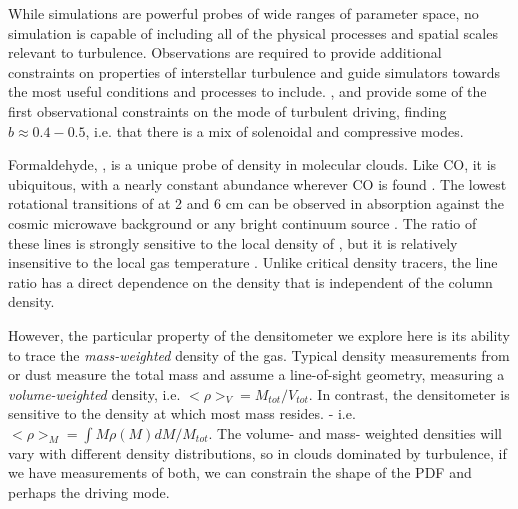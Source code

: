 While simulations are powerful probes of wide ranges of parameter space, no
simulation is capable of including all of the physical processes and spatial
scales relevant to turbulence.  Observations are required to provide additional
constraints on properties of interstellar turbulence and guide simulators
towards the most useful conditions and processes to include.
\citet{Brunt2010c}, \citet{Kainulainen2012a} and \citet{Kainulainen2013a} provide some
of the first observational constraints on the mode of turbulent driving,
finding $b\approx0.4-0.5$, i.e. that there is a mix of solenoidal and
compressive modes.


Formaldehyde, \formaldehyde, is a unique probe of density in molecular clouds.
Like CO, it is ubiquitous, with a nearly constant abundance wherever CO is
found \citep{Mangum1993a,Tang2013a}.  The lowest rotational transitions of
\ortho at 2 and 6 cm can be observed in absorption against the cosmic microwave
background or any bright continuum source \citep{Ginsburg2011a,Darling2012b}.
The ratio of these lines is strongly sensitive to the local density of \hh, but
it is relatively insensitive to the local gas temperature
\citep{Troscompt2009a,Wiesenfeld2013a}.  Unlike critical density tracers, the
\formaldehyde line ratio has a direct dependence on the density that is
independent of the column density.

However, the particular property of the \formaldehyde densitometer we explore
here is its ability to trace the \emph{mass-weighted} density of the gas.
Typical density measurements from \thirteenco or dust measure the total mass
and assume a line-of-sight geometry, measuring a \emph{volume-weighted}
density, i.e. $<\rho>_V = M_{tot}/V_{tot}$.  In contrast, the \formaldehyde
densitometer is sensitive to the density at which most mass resides.
 - i.e. $<\rho>_M = \int M \rho(M) d M / M_{tot}$.  
The volume- and mass- weighted densities will vary with different density
distributions, so in clouds dominated by turbulence, if we have measurements of
both, we can constrain the shape of the PDF and perhaps the driving mode.

